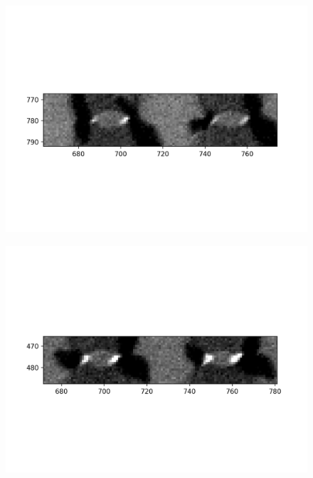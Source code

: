 \documentclass[10pt,a4paper]{article}
\begin{document}
\begin{figure}
	\includegraphics{data/image_stamps/e1}
\end{figure}
\begin{figure}
	\includegraphics{data/image_stamps/e2}
\end{figure}
	
\end{document}
